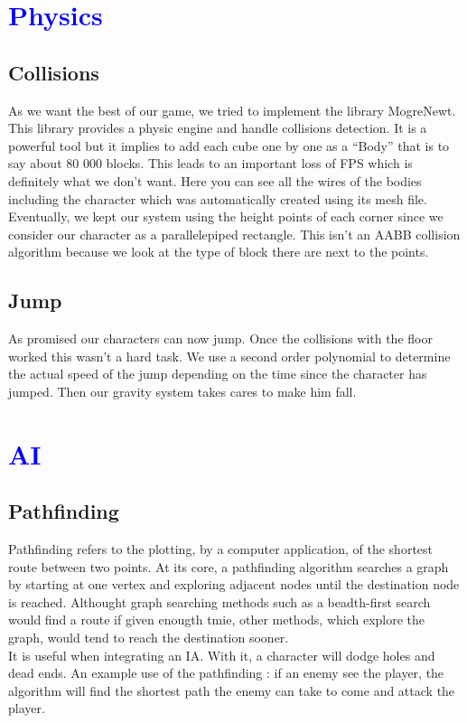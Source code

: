 \documentclass[article]{report}             %
\begin{document}
		\chapter{\textcolor{blue}{Physics}}
			\section{Collisions}
				As we want the best of our game, we tried to implement the library MogreNewt. This library provides a physic engine and handle collisions detection. It is a powerful tool but it implies to add each cube one by one as a \enquote{Body} that is to say about 80 000 blocks. This leads to an important loss of FPS which is definitely what we don't want. Here you can see all the wires of the bodies including the character which was automatically created using its mesh file.\\

Eventually, we kept our system using the height points of each corner since we consider our character as a parallelepiped rectangle. This isn't an AABB collision algorithm because we look at the type of block there are next to the points.

			\section{Jump}
				As promised our characters can now jump. Once the collisions with the floor worked this wasn't a hard task. We use a second order polynomial to determine the actual speed of the jump depending on the time since the character has jumped. Then our gravity system takes cares to make him fall.

		\chapter{\textcolor{blue}{AI}}
			\section{Pathfinding}
				Pathfinding refers to the plotting, by a computer application, of the shortest route between two points. At its core, a pathfinding algorithm searches a graph by starting at one vertex and exploring adjacent nodes until the destination node is reached. Althought graph searching methods such as a beadth-first search would find a route if given enougth tmie, other methods, which explore the graph, would tend to reach the destination sooner. \\
 It is useful when integrating an IA. With it, a character will dodge holes and dead ends. An example use of the pathfinding : if an enemy see the player, the algorithm will find the shortest path the enemy can take to come and attack the player.
\end{document}
